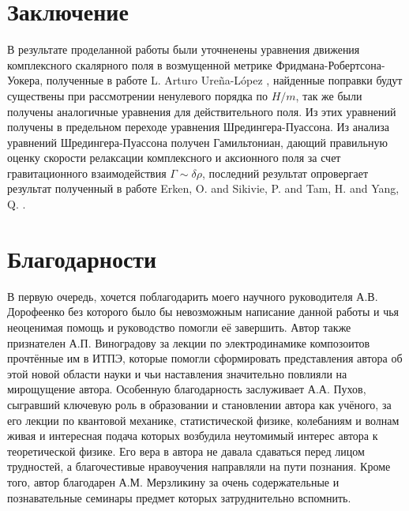 \setcounter{equation}{0}

\section{Заключение}\label{slast}
\qquad В результате проделанной работы были уточненены уравнения движения комплексного скалярного поля в возмущенной метрике Фридмана-Робертсона-Уокера, полученные в работе L. Arturo Ureña-López \cite{SF}, найденные поправки будут существены при рассмотрении ненулевого порядка по $H/m$, так же были получены аналогичные уравнения для действительного поля. Из этих уравнений получены в предельном переходе уравнения Шредингера-Пуассона. Из анализа уравнений Шредингера-Пуассона получен Гамильтониан, дающий правильную оценку скорости релаксации комплексного и аксионного поля за счет гравитационного взаимодействия $\Gamma\sim\delta\rho$, последний результат опровергает результат полученный в работе Erken, O. and Sikivie, P. and Tam, H. and Yang, Q. \cite{Sikivie}.

\pagebreak[4]


\section*{Благодарности}\label{ty}

В первую очередь, хочется поблагодарить моего научного руководителя А.В. Дорофеенко без которого было бы невозможным написание данной работы и чья неоценимая помощь и руководство помогли её завершить. Автор также признателен А.П. Виноградову за лекции по электродинамике композоитов прочтённые им в ИТПЭ, которые помогли сформировать представления автора об этой новой области науки и чьи наставления значительно повлияли на мирощущение автора. Особенную благодарность заслуживает А.А. Пухов, сыгравший ключевую роль в образовании и становлении автора как учёного, за его лекции по квантовой механике, статистической физике, колебаниям и волнам живая и интересная подача которых возбудила неутомимый интерес автора к теоретической физике. Его вера в автора не давала сдаваться перед лицом трудностей, а благочестивые нравоучения направляли на пути познания. Кроме того, автор благодарен А.М. Мерзликину
за очень содержательные и познавательные семинары предмет которых затруднительно вспомнить. 


\pagebreak[4]